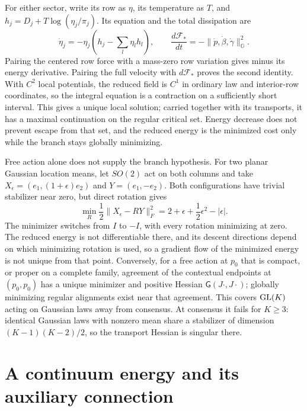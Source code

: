 For either sector, write its row as $\eta$, its temperature as $T$, and $h_j=D_j+T\log(\eta_j/\pi_j)$. Its equation and the total dissipation are
\begin{equation}
 \dot\eta_j=-\eta_j\left(h_j-\sum_l\eta_lh_l\right),\qquad
 \frac{d\mathcal F_*}{dt}=-\|\dot p,\dot\beta,\dot\gamma\|_{\mathbb G}^2.
 \label{comp:ctx:finite-dissipation}
\end{equation}
Pairing the centered row force with a mass-zero row variation gives minus its energy derivative. Pairing the full velocity with $d\mathcal F_*$ proves the second identity. With $C^2$ local potentials, the reduced field is $C^1$ in ordinary law and interior-row coordinates, so the integral equation is a contraction on a sufficiently short interval. This gives a unique local solution; carried together with its transports, it has a maximal continuation on the regular critical set. Energy decrease does not prevent escape from that set, and the reduced energy is the minimized cost only while the branch stays globally minimizing.

Free action alone does not supply the branch hypothesis. For two planar Gaussian location means, let $SO(2)$ act on both columns and take $X_\epsilon=(e_1,(1+\epsilon)e_2)$ and $Y=(e_1,-e_2)$. Both configurations have trivial stabilizer near zero, but direct rotation gives
\begin{equation}
 \min_R\frac12\|X_\epsilon-RY\|_F^2
       =2+\epsilon+\frac12\epsilon^2-|\epsilon|.
 \label{comp:ctx:cusp}
\end{equation}
The minimizer switches from $I$ to $-I$, with every rotation minimizing at zero. The reduced energy is not differentiable there, and its descent directions depend on which minimizing rotation is used, so a gradient flow of the minimized energy is not unique from that point. Conversely, for a free action at $p_0$ that is compact, or proper on a complete family, agreement of the contextual endpoints at $(p_0,p_0)$ has a unique minimizer and positive Hessian $\mathsf G(J\cdot,J\cdot)$; globally minimizing regular alignments exist near that agreement. This covers $\mathrm{GL}(K)$ acting on Gaussian laws away from consensus. At consensus it fails for $K\geq3$: identical Gaussian laws with nonzero mean share a stabilizer of dimension $(K-1)(K-2)/2$, so the transport Hessian is singular there.

\section{A continuum energy and its auxiliary connection}

